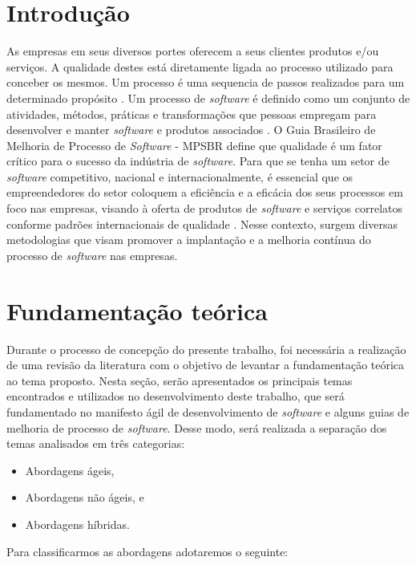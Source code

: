 \documentclass{acm_proc_article-sp}
\begin{document}
\section{Introdução}
As empresas em seus diversos portes oferecem a seus clientes produtos e/ou serviços. A qualidade destes está diretamente ligada ao processo utilizado para conceber os mesmos. Um processo é uma sequencia de passos realizados para um determinado propósito \cite{ieee}. Um processo de \textit{software} é definido como um conjunto de atividades, métodos, práticas e transformações que pessoas empregam para desenvolver e manter \textit{software} e produtos associados \cite{weber}. O Guia Brasileiro de Melhoria de Processo de \textit{Software} - MPSBR define que qualidade é um fator crítico para o sucesso
da indústria de \textit{software}. Para que se tenha um setor de \textit{software} competitivo, nacional e internacionalmente, é essencial que os empreendedores do setor coloquem a eficiência e a eficácia dos seus processos em foco nas empresas,
visando à oferta de produtos de \textit{software} e serviços correlatos conforme padrões internacionais de qualidade \cite{mpsbr:nAgil}. Nesse contexto, surgem diversas metodologias que visam promover a implantação e a melhoria contínua do processo de \textit{software} nas empresas.

\section{Fundamentação teórica}
Durante o processo de concepção do presente trabalho, foi necessária a realização de uma revisão da literatura com o objetivo de levantar a fundamentação teórica ao tema proposto. Nesta seção, serão apresentados os principais temas encontrados e utilizados no desenvolvimento deste trabalho, que será fundamentado no manifesto ágil de desenvolvimento de \textit{software} \cite{manifesto:agil} e alguns guias de melhoria de processo de \textit{software}. Desse modo, será realizada a separação dos temas analisados em três categorias:

\begin{itemize}
\item Abordagens ágeis,
\item Abordagens não ágeis, e
\item Abordagens híbridas.
\end{itemize}

Para classificarmos as abordagens adotaremos o seguinte: 
\end{document}
